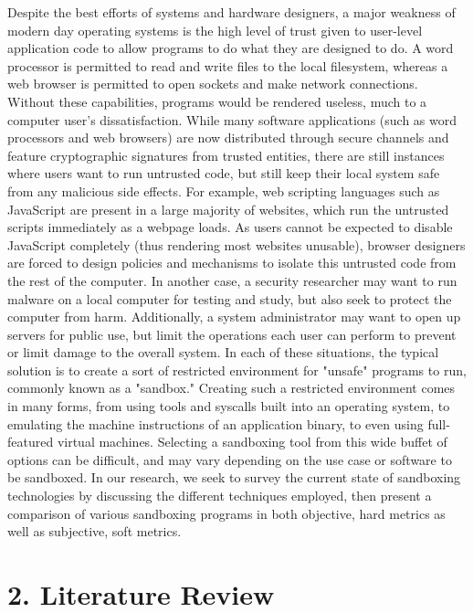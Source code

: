 \documentclass{proc}
\begin{document}
Despite the best efforts of systems and hardware designers, a major weakness of modern day operating systems is the high level of trust given to user-level application code to allow programs to do what they are designed to do. A word processor is permitted to read and write files to the local filesystem, whereas a web browser is permitted to open sockets and make network connections. Without these capabilities, programs would be rendered useless, much to a computer user's dissatisfaction.
\newline\newline
While many software applications (such as word processors and web browsers) are now distributed through secure channels and feature cryptographic signatures from trusted entities, there are still instances where users want to run untrusted code, but still keep their local system safe from any malicious side effects. For example, web scripting languages such as JavaScript are present in a large majority of websites, which run the untrusted scripts immediately as a webpage loads. As users cannot be expected to disable JavaScript completely (thus rendering most websites unusable), browser designers are forced to design policies and mechanisms to isolate this untrusted code from the rest of the computer. In another case, a security researcher may want to run malware on a local computer for testing and study, but also seek to protect the computer from harm. Additionally, a system administrator may want to open up servers for public use, but limit the operations each user can perform to prevent or limit damage to the overall system.
\newline\newline
In each of these situations, the typical solution is to create a sort of restricted environment for "unsafe" programs to run, commonly known as a "sandbox." Creating such a restricted environment comes in many forms, from using tools and syscalls built into an operating system, to emulating the machine instructions of an application binary, to even using full-featured virtual machines. Selecting a sandboxing tool from this wide buffet of options can be difficult, and may vary depending on the use case or software to be sandboxed. In our research, we seek to survey the current state of sandboxing technologies by discussing the different techniques employed, then present a comparison of various sandboxing programs in both objective, hard metrics as well as subjective, soft metrics.

\section*{2. Literature Review}
\end{document}
